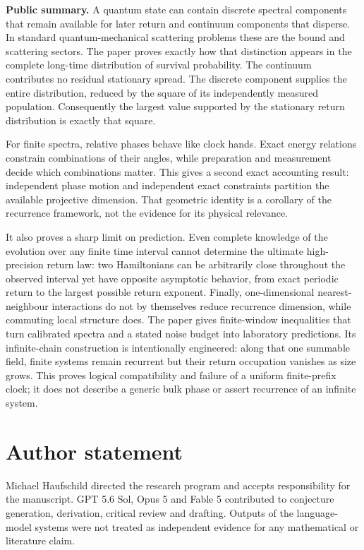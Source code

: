 \documentclass[10pt]{article}
\theoremstyle{definition}
\begin{document}
\noindent\textbf{Public summary.}
A quantum state can contain discrete spectral components that remain
available for later return and continuum components that disperse.  In
standard quantum-mechanical scattering problems these are the bound and
scattering sectors.  The paper proves exactly how that distinction appears
in the complete long-time distribution of survival probability.  The
continuum contributes no residual stationary spread.  The discrete component
supplies the entire distribution, reduced by the square of its independently
measured population.  Consequently the largest value supported by the
stationary return distribution is exactly that square.

For finite spectra, relative phases behave like clock hands.  Exact energy
relations constrain combinations of their angles, while preparation and
measurement decide which combinations matter.  This gives a second exact
accounting result: independent phase motion and independent exact constraints
partition the available projective dimension.  That geometric identity is a
corollary of the recurrence framework, not the evidence for its physical
relevance.

It also proves a sharp limit on prediction.  Even complete knowledge of the
evolution over any finite time interval cannot determine the ultimate
high-precision return law: two Hamiltonians can be arbitrarily close
throughout the observed interval yet have opposite asymptotic behavior, from
exact periodic return to the largest possible return exponent.  Finally,
one-dimensional nearest-neighbour interactions do not by themselves reduce
recurrence dimension, while commuting local structure does.  The paper gives
finite-window inequalities that turn calibrated spectra and a stated noise
budget into laboratory predictions.  Its infinite-chain construction is
intentionally engineered: along that one summable field, finite systems
remain recurrent but their return occupation vanishes as size grows.  This
proves logical compatibility and failure of a uniform finite-prefix clock;
it does not describe a generic bulk phase or assert recurrence of an infinite
system.



\appendix



\section*{Author statement}
Michael Haufschild directed the research program and accepts responsibility
for the manuscript.  GPT 5.6 Sol, Opus 5 and Fable 5 contributed to
conjecture generation, derivation, critical review and drafting.  Outputs of
the language-model systems were not treated as independent evidence for any
mathematical or literature claim.


\end{document}
